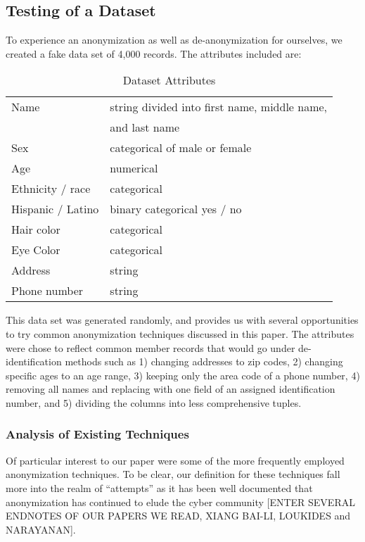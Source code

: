 \documentclass[10pt,journal,compsoc]{IEEEtran}
\begin{document}
\subsection{Testing of a Dataset}
To experience an anonymization as well as de-anonymization for ourselves, we created a fake data set of 4,000 records.  The attributes included are:

\begin{table} [ht]
\caption{Dataset Attributes}
\begin{tabular}{|l|l|}
\hline
Name & string divided into first name, middle name,\\ & and last name\\
\hline
Sex & categorical of male or female\\
\hline
Age & numerical\\
\hline
Ethnicity / race & categorical\\
\hline
Hispanic / Latino & binary categorical yes / no\\
\hline
Hair color & categorical\\
\hline
Eye Color & categorical\\
\hline 
Address & string\\
\hline
Phone number & string\\
\hline

\end{tabular}
\end{table}

This data set was generated randomly, and provides us with several opportunities to try common anonymization techniques discussed in this paper.  The attributes were chose to reflect common member records that would go under de-identification methods such as 1) changing addresses to zip codes, 2) changing specific ages to an age range, 3) keeping only the area code of a phone number, 4) removing all names and replacing with one field of an assigned identification number, and 5) dividing the columns into less comprehensive tuples.


\subsubsection{Analysis of Existing Techniques}

	Of particular interest to our paper were some of the more frequently employed anonymization techniques.  To be clear, our definition for these techniques fall more into the realm of “attempts” as it has been well documented that anonymization has continued to elude the cyber community [ENTER SEVERAL ENDNOTES OF OUR PAPERS WE READ, XIANG BAI-LI, LOUKIDES and NARAYANAN].  \linebreak
	
\end{document}
